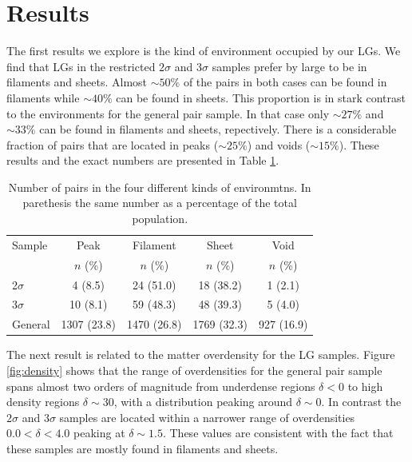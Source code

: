 \documentclass{emulateapj}
\begin{document}
\section{Results}
\label{sec:results}

The first results we explore is the kind of environment occupied by
our LGs. We find that LGs in the restricted $2\sigma$ and $3\sigma$
samples prefer by large to be in filaments and sheets. Almost $\sim 50\%$ of the
pairs in both cases can be found in filaments while $\sim 40\%$ can be
found in sheets. This proportion is in stark contrast to the
environments for the general pair sample. In that case only $\sim
27\%$ and $\sim 33\%$ can be found in filaments and sheets,
repectively. There is a considerable fraction of pairs that are
located in peaks ($\sim 25\%$) and voids ($\sim 15\%$). These results
and the exact numbers are presented in Table \ref{table:web_type}.


\begin{table}
\begin{center}
\begin{tabular}{lcccc}\hline\hline
Sample & Peak & Filament & Sheet & Void\\
       & $n$ (\%) & $n$ (\%) & $n$ (\%) & $n$ (\%) \\\hline
2$\sigma$ & 4 (8.5) & 24 (51.0) &  18 (38.2) & 1 (2.1)\\
3$\sigma$ & 10 (8.1) & 59 (48.3) & 48 (39.3) & 5 (4.0)\\  
General & 1307 (23.8) & 1470 (26.8) & 1769 (32.3) & 927 (16.9)\\\hline
\end{tabular}
\caption{
Number of pairs in the four different kinds of environmtns. In
parethesis the same number as a percentage of the
total population. 
\label{table:web_type}}
\end{center}
\end{table}



The next result is related to the matter overdensity for the LG
samples. Figure \ref{fig:density} shows that the range of
overdensities for the general pair sample spans almost two orders of
magnitude from underdense regions $\delta<0$ to high density regions
$\delta\sim 30$, with a distribution peaking around $\delta \sim
0$. In contrast the $2\sigma$ and $3\sigma$ samples are located within
a narrower range of overdensities $0.0<\delta<4.0$ peaking at $\delta
\sim 1.5$. These values are consistent with the fact that these
samples are mostly found in filaments and sheets. 
\end{document}
